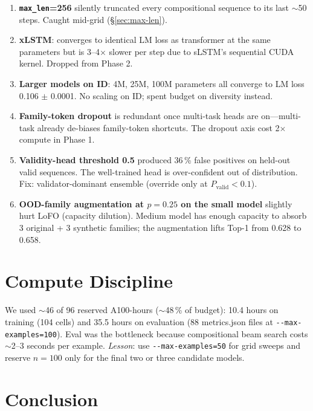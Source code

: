 \documentclass[11pt,a4paper]{article}
\begin{document}
\begin{enumerate}[leftmargin=*,itemsep=1pt]
\item \textbf{\texttt{max\_len}=256} silently truncated every compositional sequence to its last $\sim$50 steps. Caught mid-grid (\S\ref{sec:max-len}).
\item \textbf{xLSTM}: converges to identical LM loss as transformer at the same parameters but is 3--4$\times$ slower per step due to sLSTM's sequential CUDA kernel. Dropped from Phase 2.
\item \textbf{Larger models on ID}: 4M, 25M, 100M parameters all converge to LM loss 0.106 $\pm$ 0.0001. No scaling on ID; spent budget on diversity instead.
\item \textbf{Family-token dropout} is redundant once multi-task heads are on---multi-task already de-biases family-token shortcuts. The dropout axis cost 2$\times$ compute in Phase 1.
\item \textbf{Validity-head threshold 0.5} produced 36\,\% false positives on held-out valid sequences. The well-trained head is over-confident out of distribution. Fix: validator-dominant ensemble (override only at $P_\text{valid}<0.1$).
\item \textbf{OOD-family augmentation at $p=0.25$ on the small model} slightly hurt LoFO (capacity dilution). Medium model has enough capacity to absorb 3 original + 3 synthetic families; the augmentation lifts Top-1 from 0.628 to 0.658.
\end{enumerate}

\section{Compute Discipline}\label{sec:compute}

We used $\sim$46 of 96 reserved A100-hours ($\sim$48\,\% of budget): 10.4 hours on training (104 cells) and 35.5 hours on evaluation (88 metrics.json files at \verb|--max-examples=100|). Eval was the bottleneck because compositional beam search costs $\sim$2--3 seconds per example. \emph{Lesson}: use \verb|--max-examples=50| for grid sweeps and reserve $n{=}100$ only for the final two or three candidate models.

\section{Conclusion}\label{sec:conclusion}
\end{document}

